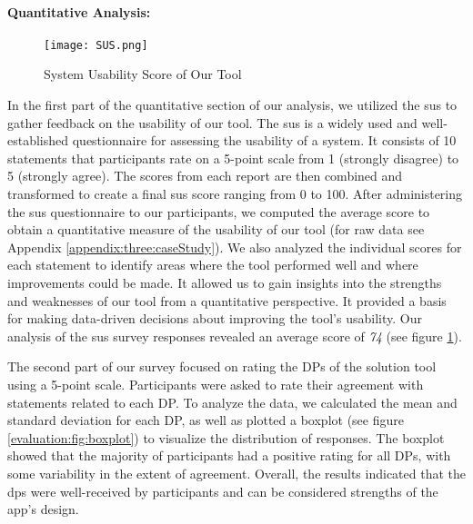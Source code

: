 \paragraph{Quantitative Analysis:}
\begin{figure}[ht]
    \centering
    \texttt{[image: SUS.png]}
    \caption{System Usability Score of Our Tool}
    \label{evaluation:fig:sus}
\end{figure}
In the first part of the quantitative section of our analysis, we utilized the \ac{sus} to gather feedback on the usability of our tool. 
The \ac{sus} is a widely used and well-established questionnaire for assessing the usability of a system. 
It consists of 10 statements that participants rate on a 5-point scale from 1 (strongly disagree) to 5 (strongly agree). 
The scores from each report are then combined and transformed to create a final \ac{sus} score ranging from 0 to 100.
After administering the \ac{sus} questionnaire to our participants, we computed the average score to obtain a quantitative measure of the usability of our tool (for raw data see Appendix \ref{appendix:three:caseStudy}). 
We also analyzed the individual scores for each statement to identify areas where the tool performed well and where improvements could be made. 
It allowed us to gain insights into the strengths and weaknesses of our tool from a quantitative perspective. 
It provided a basis for making data-driven decisions about improving the tool's usability. 
Our analysis of the \ac{sus} survey responses revealed an average score of \textit{74} (see figure \ref{evaluation:fig:sus}).

The second part of our survey focused on rating the DPs of the solution tool using a 5-point scale. 
Participants were asked to rate their agreement with statements related to each DP. 
To analyze the data, we calculated the mean and standard deviation for each DP, as well as plotted a boxplot (see figure \ref{evaluation:fig:boxplot}) to visualize the distribution of responses. 
The boxplot showed that the majority of participants had a positive rating for all DPs, with some variability in the extent of agreement. 
Overall, the results indicated that the \ac{dp}s were well-received by participants and can be considered strengths of the app's design.

